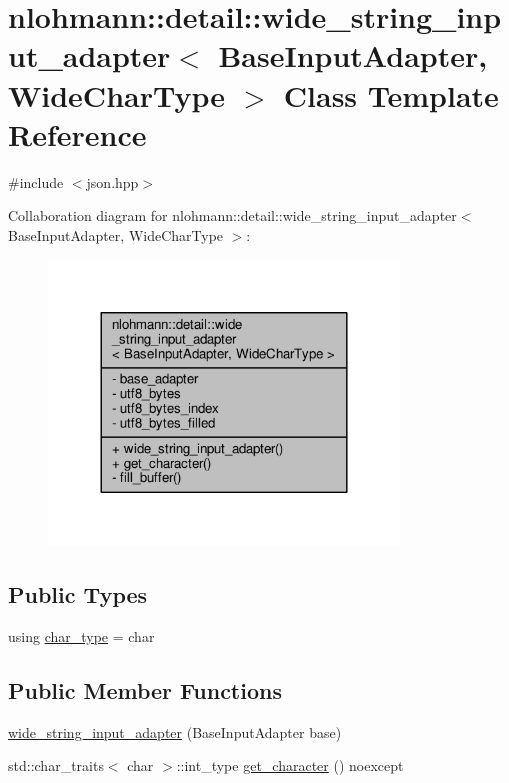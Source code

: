 \hypertarget{classnlohmann_1_1detail_1_1wide__string__input__adapter}{}\section{nlohmann\+:\+:detail\+:\+:wide\+\_\+string\+\_\+input\+\_\+adapter$<$ Base\+Input\+Adapter, Wide\+Char\+Type $>$ Class Template Reference}
\label{classnlohmann_1_1detail_1_1wide__string__input__adapter}


{\ttfamily \#include $<$json.\+hpp$>$}



Collaboration diagram for nlohmann\+:\+:detail\+:\+:wide\+\_\+string\+\_\+input\+\_\+adapter$<$ Base\+Input\+Adapter, Wide\+Char\+Type $>$\+:
\nopagebreak
\begin{figure}[H]
\begin{center}
\leavevmode
\includegraphics[width=264pt]{classnlohmann_1_1detail_1_1wide__string__input__adapter__coll__graph}
\end{center}
\end{figure}
\subsection*{Public Types}
\begin{DoxyCompactItemize}
\item 
using \hyperlink{classnlohmann_1_1detail_1_1wide__string__input__adapter_a7b9f8684206b5dadf0e96986577dfc24}{char\+\_\+type} = char
\end{DoxyCompactItemize}
\subsection*{Public Member Functions}
\begin{DoxyCompactItemize}
\item 
\hyperlink{classnlohmann_1_1detail_1_1wide__string__input__adapter_aa12146f16f0a22ae3d23bd4af7460fcd}{wide\+\_\+string\+\_\+input\+\_\+adapter} (Base\+Input\+Adapter base)
\item 
std\+::char\+\_\+traits$<$ char $>$\+::int\+\_\+type \hyperlink{classnlohmann_1_1detail_1_1wide__string__input__adapter_a50f9436820b9caa9708ea69e2ba0230b}{get\+\_\+character} () noexcept
\end{DoxyCompactItemize}
